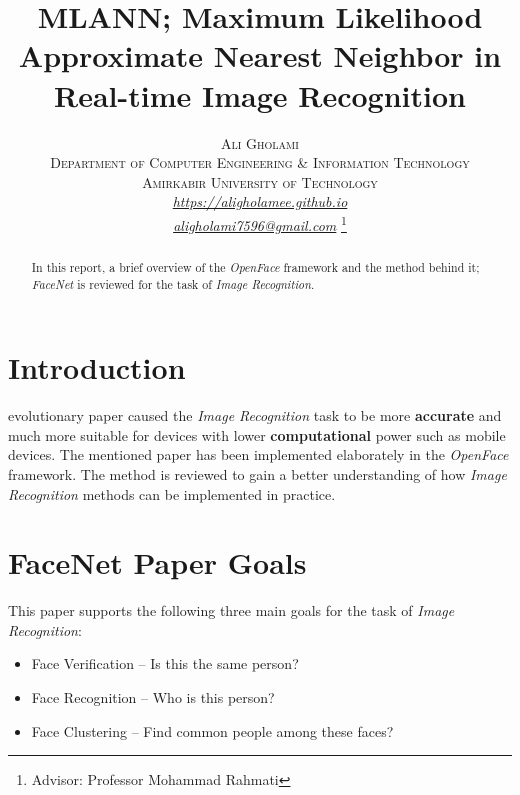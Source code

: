 \documentclass[journal, a4paper]{IEEEtran}
\begin{document}
	\title{MLANN; Maximum Likelihood Approximate Nearest Neighbor in Real-time Image Recognition}
	\author{\textsc{Ali Gholami\\ Department of Computer Engineering \& Information Technology\\ Amirkabir University of Technology}\\\textit{\url{https://aligholamee.github.io}\\\url{aligholami7596@gmail.com}}
	\thanks{Advisor: Professor Mohammad Rahmati}}
	\maketitle

\begin{abstract}
	In this report, a brief overview of the \textit{OpenFace} framework and the method behind it; \textit{FaceNet} is reviewed for the task of \textit{Image Recognition}.
\end{abstract}

\section{Introduction}
	 evolutionary paper \cite{HOP96} caused the \textit{Image Recognition} task to be more \textbf{accurate} and much more suitable for devices with lower \textbf{computational} power such as mobile devices. The mentioned paper has been implemented elaborately in the \textit{OpenFace} framework. The method is reviewed to gain a better understanding of how \textit{Image Recognition} methods can be implemented in practice.

\section{FaceNet Paper Goals}
	This paper supports the following three main goals for the task of \textit{Image Recognition}:\\
	\begin{itemize}
		\item Face Verification -- Is this the same person?
		\item Face Recognition -- Who is this person?
		\item Face Clustering -- Find common people among these faces?
	\end{itemize}
\end{document}
